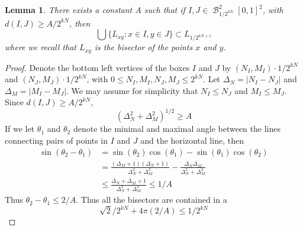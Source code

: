 \documentclass[dvipsnames,letterpaper,12pt]{article}
\numberwithin{equation}{section}
\theoremstyle{plain}
\newtheorem{lemma}{Lemma}
\theoremstyle{remark}
\DeclareMathOperator{\B}{\mathcal{B}}
\begin{document}
\begin{lemma}
	There exists a constant $A$ such that if $I, J \in \B^2_{1/2^{kN}}[0,1]^2$, with $d(I,J) \geq A/2^{kN}$, then
	\[ \bigcup \{ L_{xy}: x \in I, y \in J \} \subset L_{1/2^{kN+1}} \]
	where we recall that $L_{xy}$ is the bisector of the points $x$ and $y$.
\end{lemma}
\begin{proof}
	Denote the bottom left vertices of the boxes $I$ and $J$ by $(N_I,M_I) \cdot 1/2^{kN}$ and $(N_J,M_J) \cdot 1/2^{kN}$, with $0 \leq N_I,M_I,N_J,M_J \leq 2^{kN}$. Let $\Delta_N = |N_I - N_J|$ and $\Delta_M = |M_I - M_J|$. We may assume for simplicity that $N_I \leq N_J$ and $M_I \leq M_J$. Since $d(I,J) \geq A/2^{kN}$,
	\[ (\Delta_N^2 + \Delta_M^2)^{1/2} \geq A \]
	If we let $\theta_1$ and $\theta_2$ denote the minimal and maximal angle between the lines connecting pairs of points in $I$ and $J$ and the horizontal line, then
	\begin{align*}
		\sin(\theta_2 - \theta_1) &= \sin(\theta_2) \cos(\theta_1) - \sin(\theta_1) \cos(\theta_2)\\
		&= \frac{(\Delta_M + 1)(\Delta_N + 1)}{\Delta_N^2 + \Delta_M^2} - \frac{\Delta_N \Delta_M}{\Delta_N^2 + \Delta_M^2}\\
		&\leq \frac{\Delta_N + \Delta_M + 1}{\Delta_N^2 + \Delta_M^2} \leq 1/A
	\end{align*}
	Thus $\theta_2 - \theta_1 \leq 2/A$. Thus all the bisectors are contained in a
	\[ \sqrt{2}/2^{kN} + 4\pi(2/A) \leq 1/2^{kN} \]
\end{proof}
\end{document}
